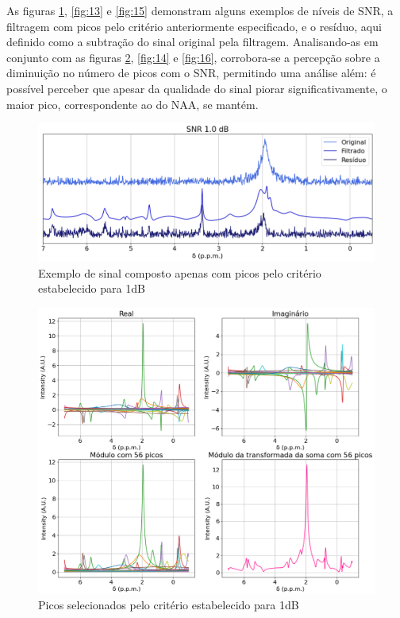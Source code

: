 \documentclass[12pt]{article}
\begin{document}
As figuras \ref{fig:11}, \ref{fig:13} e \ref{fig:15} demonstram alguns exemplos de níveis de SNR, a filtragem com picos pelo critério anteriormente especificado, e o resíduo, aqui definido 
como a subtração do sinal original pela filtragem. Analisando-as em conjunto com as figuras \ref{fig:12}, \ref{fig:14} e \ref{fig:16}, corrobora-se a percepção sobre a diminuição no número 
de picos com o SNR, permitindo uma análise além: é possível perceber que apesar da qualidade do sinal piorar significativamente, o maior pico, correspondente ao do NAA, se mantém. 

\begin{figure} [H]
    \centering
    \includegraphics[scale=0.5]{original-filtrado-residuo-1.png}
    \caption{Exemplo de sinal composto apenas com picos pelo critério estabelecido para 1dB}
    \label{fig:11}
\end{figure}

\begin{figure} [H]
    \centering
    \includegraphics[scale=0.5]{real-imag-modulo-1.png}
    \caption{Picos selecionados pelo critério estabelecido para 1dB}
    \label{fig:12}
\end{figure}
\end{document}
